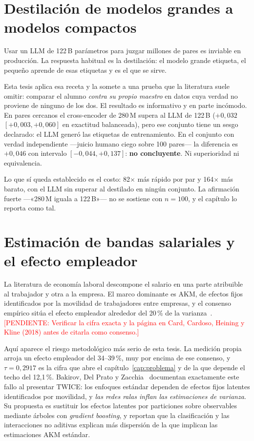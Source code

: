 \documentclass[12pt,a4paper,oneside]{report}
\newcommand{\pend}[1]{\textcolor{red}{\small[PENDIENTE: #1]}}
\begin{document}
\section{Destilación de modelos grandes a modelos compactos}
\label{sec:destilacion}

Usar un LLM de 122\,B parámetros para juzgar millones de pares es inviable en producción.
La respuesta habitual es la destilación: el modelo grande etiqueta, el pequeño aprende de
esas etiquetas y es el que se sirve.

Esta tesis aplica esa receta y la somete a una prueba que la literatura suele omitir:
comparar el alumno \emph{contra su propio maestro} en datos cuya verdad no proviene de
ninguno de los dos. El resultado es informativo y en parte incómodo. En pares cercanos el
cross-encoder de 280\,M supera al LLM de 122\,B ($+0{,}032$ $[+0{,}003, +0{,}060]$ en
exactitud balanceada), pero ese conjunto tiene un sesgo declarado: el LLM generó las
etiquetas de entrenamiento. En el conjunto con verdad independiente —juicio humano ciego
sobre 100 pares— la diferencia es $+0{,}046$ con intervalo $[-0{,}044, +0{,}137]$:
\textbf{no concluyente}. Ni superioridad ni equivalencia.

Lo que sí queda establecido es el costo: 82$\times$ más rápido por par y 164$\times$ más
barato, con el LLM sin superar al destilado en ningún conjunto. La afirmación fuerte
—«280\,M iguala a 122\,B»— no se sostiene con $n=100$, y el capítulo lo reporta como tal.

\section{Estimación de bandas salariales y el efecto empleador}
\label{sec:salarios}

La literatura de economía laboral descompone el salario en una parte atribuible al
trabajador y otra a la empresa. El marco dominante es AKM, de efectos fijos identificados
por la movilidad de trabajadores entre empresas, y el consenso empírico sitúa el efecto
empleador alrededor del 20\,\% de la varianza~\cite{card2018firms}.
\pend{Verificar la cifra exacta y la página en Card, Cardoso, Heining y Kline (2018) antes
de citarla como consenso.}

Aquí aparece el riesgo metodológico más serio de esta tesis. La medición propia arroja un
efecto empleador del 34--39\,\%, muy por encima de ese consenso, y
$\tau = 0{,}2917$ es la cifra que abre el capítulo~\ref{cap:problema} y de la que depende el
techo del 12,1\,\%. Bakirov, Del Prato y Zacchia~\cite{twice2026} documentan
exactamente este fallo al presentar TWICE: los enfoques estándar dependen de efectos fijos
latentes identificados por movilidad, y \emph{las redes ralas inflan las estimaciones de
varianza}. Su propuesta es sustituir los efectos latentes por particiones sobre
observables mediante árboles con \emph{gradient boosting}, y reportan que la clasificación
y las interacciones no aditivas explican más dispersión de la que implican las
estimaciones AKM estándar.
\end{document}
